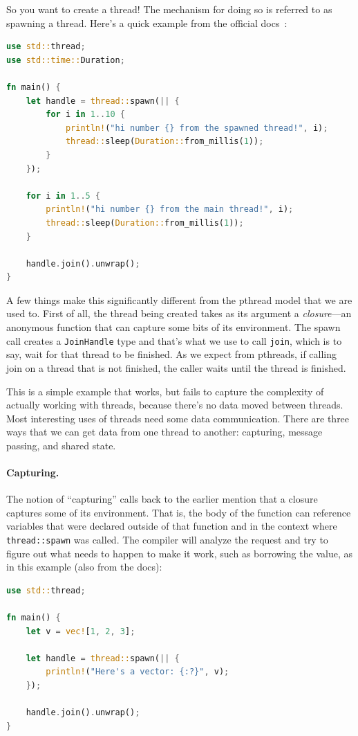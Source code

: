So you want to create a thread! The mechanism for doing so is referred to as spawning a thread. Here's a quick example from the official docs~\cite{rustdocs}:

\begin{lstlisting}[language=Rust]
use std::thread;
use std::time::Duration;

fn main() {
    let handle = thread::spawn(|| {
        for i in 1..10 {
            println!("hi number {} from the spawned thread!", i);
            thread::sleep(Duration::from_millis(1));
        }
    });

    for i in 1..5 {
        println!("hi number {} from the main thread!", i);
        thread::sleep(Duration::from_millis(1));
    }

    handle.join().unwrap();
}
\end{lstlisting}

A few things make this significantly different from the pthread model that we are used to. First of all, the thread being created takes as its argument a \textit{closure}---an anonymous function that can capture some bits of its environment. The spawn call creates a \texttt{JoinHandle} type and that's what we use to call \texttt{join}, which is to say, wait for that thread to be finished. As we expect from pthreads, if calling join on a thread that is not finished, the caller waits until the thread is finished.

This is a simple example that works, but fails to capture the complexity of actually working with threads, because there's no data moved between threads. Most interesting uses of threads need some data communication. There are three ways that we can get data from one thread to another: capturing, message passing, and shared state.

\paragraph{Capturing.} 
The notion of ``capturing'' calls back to the earlier mention that a closure captures some of its environment. That is, the body of the function can reference variables that were declared outside of that function and in the context where \texttt{thread::spawn} was called. The compiler will analyze the request and try to figure out what needs to happen to make it work, such as borrowing the value, as in this example (also from the docs):

\begin{lstlisting}[language=Rust]
use std::thread;

fn main() {
    let v = vec![1, 2, 3];

    let handle = thread::spawn(|| {
        println!("Here's a vector: {:?}", v);
    });

    handle.join().unwrap();
}
\end{lstlisting}

